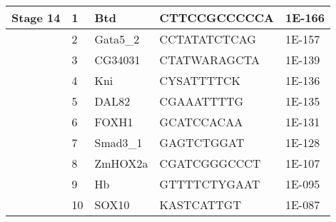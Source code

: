 \begin{center}
\begin{longtable}{|l|l|l|l|l|}
Stage 14 & 1    & Btd           & CTTCCGCCCCCA       & 1E-166  \\ \hline
         & 2    & Gata5\_2      & CCTATATCTCAG       & 1E-157  \\ \hline
         & 3    & CG34031       & CTATWARAGCTA       & 1E-139  \\ \hline
         & 4    & Kni           & CYSATTTTCK         & 1E-136  \\ \hline
         & 5    & DAL82         & CGAAATTTTG         & 1E-135  \\ \hline
         & 6    & FOXH1         & GCATCCACAA         & 1E-131  \\ \hline
         & 7    & Smad3\_1      & GAGTCTGGAT         & 1E-128  \\ \hline
         & 8    & ZmHOX2a       & CGATCGGGCCCT       & 1E-107  \\ \hline
         & 9    & Hb            & GTTTTCTYGAAT       & 1E-095  \\ \hline
         & 10   & SOX10         & KASTCATTGT         & 1E-087  \\ \hline
\end{longtable}
\end{center}

